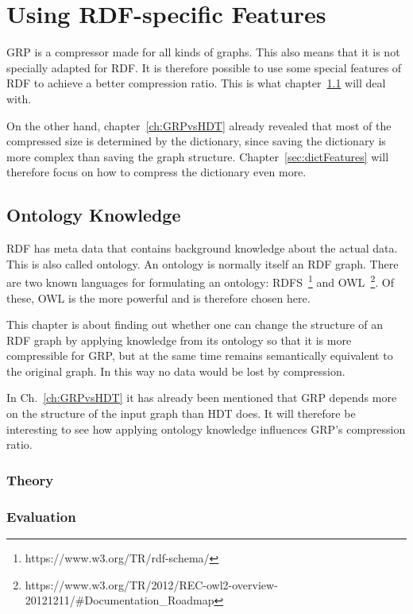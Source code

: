 \chapter{Using RDF-specific Features}\label{ch:rdfSpecificFeatures}

GRP is a compressor made for all kinds of graphs. This also means that it is not specially adapted for RDF. It is therefore possible to use some special features of RDF to achieve a better compression ratio. This is what chapter~\ref{sec:ontKnowledge} will deal with.

On the other hand, chapter~\ref{ch:GRPvsHDT} already revealed that most of the compressed size is determined by the dictionary, since saving the dictionary is more complex than saving the graph structure. Chapter~\ref{sec:dictFeatures} will therefore focus on how to compress the dictionary even more.

\section{Ontology Knowledge}\label{sec:ontKnowledge}

RDF has meta data that contains background knowledge about the actual data. This is also called ontology. An ontology is normally itself an RDF graph. There are two known languages for formulating an ontology: RDFS~\footnote{\label{foot:3}https://www.w3.org/TR/rdf-schema/} and OWL~\footnote{\label{foot:4}https://www.w3.org/TR/2012/REC-owl2-overview-20121211/\#Documentation\_Roadmap}. Of these, OWL is the more powerful and is therefore chosen here.

This chapter is about finding out whether one can change the structure of an RDF graph by applying knowledge from its ontology so that it is more compressible for GRP, but at the same time remains semantically equivalent to the original graph. In this way no data would be lost by compression.

In Ch.~\ref{ch:GRPvsHDT} it has already been mentioned that GRP depends more on the structure of the input graph than HDT does. It will therefore be interesting to see how applying ontology knowledge influences GRP's compression ratio.


\subsection{Theory}

\subsection{Evaluation}

